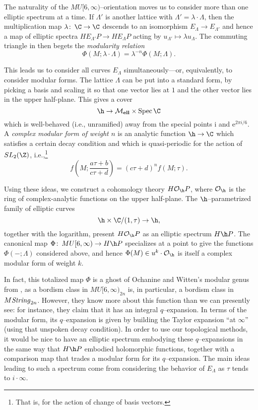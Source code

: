 \begin{example}
The naturality of the $MU[6, \infty)$--orientation moves us to consider more than one elliptic spectrum at a time.  If $\Lambda'$ is another lattice with $\Lambda' = \lambda \cdot \Lambda$, then the multiplication map $\lambda\co \C \to \C$ descends to an isomorphism $E_\Lambda \to E_{\Lambda'}$ and hence a map of elliptic spectra $HE_{\Lambda'}P \to HE_\Lambda P$ acting by $u_{\Lambda'} \mapsto \lambda u_\Lambda$.  The commuting triangle in  then begets the \textit{modularity relation} \[\Phi(M; \lambda \cdot \Lambda) = \lambda^{-n} \Phi(M; \Lambda).\]
\end{example}

\begin{example}\label{OrdinaryHomologyInUpperHalfPlaneEx}
This leads us to consider all curves $E_\Lambda$ simultaneously---or, equivalently, to consider modular forms.  The lattice $\Lambda$ can be put into a standard form, by picking a basis and scaling it so that one vector lies at $1$ and the other vector lies in the upper half-plane.  This gives a cover \[\h \to \moduli{ell} \times \Spec \C\] which is well-behaved (i.e., unramified) away from the special points $\mathrm i$ and $\mathrm e^{2 \pi i / 6}$.  A \textit{complex modular form of weight $n$} is an analytic function $\h \to \C$ which satisfies a certain decay condition and which is quasi-periodic for the action of $SL_2(\Z)$, i.e.,\footnote{That is, for the action of change of basis vectors.} \[f\left(M; \frac{a \tau + b}{c \tau + d} \right) = (c \tau + d)^n f(M; \tau).\]

Using these ideas, we construct a cohomology theory $H \sheaf O_{\h} P$, where $\sheaf O_{\h}$ is the ring of complex-analytic functions on the upper half-plane.  The $\h$--parametrized family of elliptic curves \[\h \times \C / (1, \tau) \to \h,\] together with the logarithm, present $H \sheaf O_{\h} P$ as an elliptic spectrum $H\h P$.  The canonical map $\Phi\co MU[6, \infty) \to H\h P$ specializes at a point to give the functions $\Phi(-; \Lambda)$ considered above, and hence $\Phi(M) \in u^k \cdot \sheaf O_{\h}$ is itself a complex modular form of weight $k$.
\end{example}

In fact, this totalized map $\Phi$ is a ghost of Ochanine and Witten's modular genus from , as a bordism class in $MU[6, \infty)_{2n}$ is, in particular, a bordism class in $M\mathit{String}_{2n}$.  However, they know more about this function than we can presently see: for instance, they claim that it has an integral $q$--expansion.  In terms of the modular form, its $q$--expansion is given by building the Taylor expansion ``at $\infty$'' (using that unspoken decay condition).  In order to use our topological methods, it would be nice to have an elliptic spectrum embodying these $q$--expansions in the same way that $H\h P$ embodied holomorphic functions, together with a comparison map that trades a modular form for its $q$--expansion.  The main ideas leading to such a spectrum come from considering the behavior of $E_\Lambda$ as $\tau$ tends to $i \cdot \infty$.

